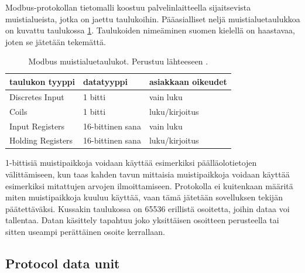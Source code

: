   Modbus-protokollan tietomalli koostuu palvelinlaitteella sijaitsevista muistialueista, jotka on jaettu taulukoihin. Pääasialliset neljä muistialuetaulukkoa on kuvattu taulukossa \ref{taulukot}. Taulukoiden nimeäminen suomen kielellä on haastavaa, joten se jätetään tekemättä.
  \begin{table}[h]
    \centering
    \caption[Modbus muistialuetaulukot.]{Modbus muistialuetaulukot. Perustuu lähteeseen \parencite{modbusAppSpec}.}
    \begin{tabular}{|l|l|l|}
      \hline
      \rowcolor{gray} taulukon tyyppi         & datatyyppi      & asiakkaan oikeudet  \\ \hline
      \cellcolor{lightgray}Discretes Input    & 1 bitti          & vain luku           \\ \hline
      \cellcolor{lightgray}Coils              & 1 bitti          & luku/kirjoitus      \\ \hline
      \cellcolor{lightgray}Input Registers    & 16-bittinen sana & vain luku           \\ \hline
      \cellcolor{lightgray}Holding Registers  & 16-bittinen sana & luku/kirjoitus      \\ \hline
    \end{tabular}
    \label{taulukot}
  \end{table}
  1-bittisiä muistipaikkoja voidaan käyttää esimerkiksi päälläolotietojen välittämiseen, kun taas kahden tavun mittaisia muistipaikkoja voidaan käyttää esimerkiksi mitattujen arvojen ilmoittamiseen. Protokolla ei kuitenkaan määritä miten muistipaikkoja kuuluu käyttää, vaan tämä jätetään sovelluksen tekijän päätettäväksi. Kussakin taulukossa on 65536 erillistä osoitetta, joihin dataa voi tallentaa. Datan käsittely tapahtuu joko yksittäisen osoitteen perusteella tai sitten useampi perättäinen osoite kerrallaan. \parencite{modbusAppSpec}

  \subsection{Protocol data unit}

